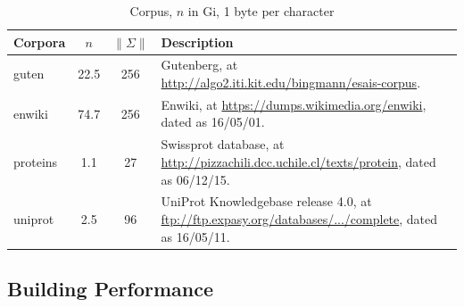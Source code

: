 \documentclass[10pt,journal,compsoc]{IEEEtran}
\begin{document}
\renewcommand\arraystretch{1.3}
\begin{table}[!h]
	\caption{Corpus, $n$ in Gi, 1 byte per character}
	\label{tbl:corpora}
	\centering
	\begin{tabular}{|l|c|c|p{5cm}|}
		\hline
		Corpora & \multicolumn{1}{c|}{$n$} & \multicolumn{1}{c|}{$\|\Sigma\|$} & Description \\\hline
		guten & 22.5 & 256 & Gutenberg, at \url{http://algo2.iti.kit.edu/bingmann/esais-corpus}.\\\hline 				
		enwiki & 74.7 & 256 & Enwiki, at \url{https://dumps.wikimedia.org/enwiki}, dated as 16/05/01. \\\hline	
		proteins & 1.1 & 27 & Swissprot database, at \url{http://pizzachili.dcc.uchile.cl/texts/protein}, dated as 06/12/15. \\\hline
		uniprot & 2.5 & 96 & UniProt Knowledgebase release 4.0, at \url{ftp://ftp.expasy.org/databases/.../complete}, dated as 16/05/11. \\\hline
	\end{tabular}
\end{table}

\subsection{Building Performance}
\end{document}
